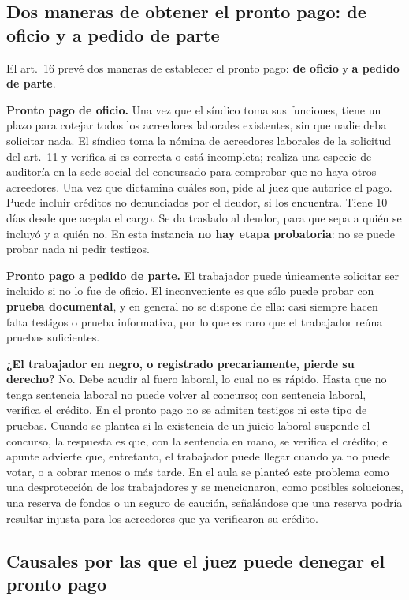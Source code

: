 \documentclass[12pt,oneside]{book}
\begin{document}
\subsection{Dos maneras de obtener el pronto pago: de oficio y a pedido de parte}

El art.~16 prevé dos maneras de establecer el pronto pago: \textbf{de oficio} y \textbf{a pedido de parte}.

\textbf{Pronto pago de oficio.} Una vez que el síndico toma sus funciones, tiene un plazo para cotejar todos los acreedores laborales existentes, sin que nadie deba solicitar nada. El síndico toma la nómina de acreedores laborales de la solicitud del art.~11 y verifica si es correcta o está incompleta; realiza una especie de auditoría en la sede social del concursado para comprobar que no haya otros acreedores. Una vez que dictamina cuáles son, pide al juez que autorice el pago. Puede incluir créditos no denunciados por el deudor, si los encuentra. Tiene 10 días desde que acepta el cargo. Se da traslado al deudor, para que sepa a quién se incluyó y a quién no. En esta instancia \textbf{no hay etapa probatoria}: no se puede probar nada ni pedir testigos.

\textbf{Pronto pago a pedido de parte.} El trabajador puede únicamente solicitar ser incluido si no lo fue de oficio. El inconveniente es que sólo puede probar con \textbf{prueba documental}, y en general no se dispone de ella: casi siempre hacen falta testigos o prueba informativa, por lo que es raro que el trabajador reúna pruebas suficientes.

\textbf{¿El trabajador en negro, o registrado precariamente, pierde su derecho?} No. Debe acudir al fuero laboral, lo cual no es rápido. Hasta que no tenga sentencia laboral no puede volver al concurso; con sentencia laboral, verifica el crédito. En el pronto pago no se admiten testigos ni este tipo de pruebas. Cuando se plantea si la existencia de un juicio laboral suspende el concurso, la respuesta es que, con la sentencia en mano, se verifica el crédito; el apunte advierte que, entretanto, el trabajador puede llegar cuando ya no puede votar, o a cobrar menos o más tarde. En el aula se planteó este problema como una desprotección de los trabajadores y se mencionaron, como posibles soluciones, una reserva de fondos o un seguro de caución, señalándose que una reserva podría resultar injusta para los acreedores que ya verificaron su crédito.

\subsection{Causales por las que el juez puede denegar el pronto pago}
\end{document}
